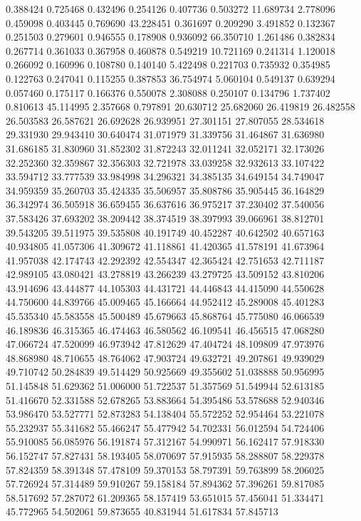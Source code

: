 0.388424
0.725468
0.432496
0.254126
0.407736
0.503272
11.689734
2.778096
0.459098
0.403445
0.769690
43.228451
0.361697
0.209290
3.491852
0.132367
0.251503
0.279601
0.946555
0.178908
0.936092
66.350710
1.261486
0.382834
0.267714
0.361033
0.367958
0.460878
0.549219
10.721169
0.241314
1.120018
0.266092
0.160996
0.108780
0.140140
5.422498
0.221703
0.735932
0.354985
0.122763
0.247041
0.115255
0.387853
36.754974
5.060104
0.549137
0.639294
0.057460
0.175117
0.166376
0.550078
2.308088
0.250107
0.134796
1.737402
0.810613
45.114995
2.357668
0.797891
20.630712
25.682060
26.419819
26.482558
26.503583
26.587621
26.692628
26.939951
27.301151
27.807055
28.534618
29.331930
29.943410
30.640474
31.071979
31.339756
31.464867
31.636980
31.686185
31.830960
31.852302
31.872243
32.011241
32.052171
32.173026
32.252360
32.359867
32.356303
32.721978
33.039258
32.932613
33.107422
33.594712
33.777539
33.984998
34.296321
34.385135
34.649154
34.749047
34.959359
35.260703
35.424335
35.506957
35.808786
35.905445
36.164829
36.342974
36.505918
36.659455
36.637616
36.975217
37.230402
37.540056
37.583426
37.693202
38.209442
38.374519
38.397993
39.066961
38.812701
39.543205
39.511975
39.535808
40.191749
40.452287
40.642502
40.657163
40.934805
41.057306
41.309672
41.118861
41.420365
41.578191
41.673964
41.957038
42.174743
42.292392
42.554347
42.365424
42.751653
42.711187
42.989105
43.080421
43.278819
43.266239
43.279725
43.509152
43.810206
43.914696
43.444877
44.105303
44.431721
44.446843
44.415090
44.550628
44.750600
44.839766
45.009465
45.166664
44.952412
45.289008
45.401283
45.535340
45.583558
45.500489
45.679663
45.868764
45.775080
46.066539
46.189836
46.315365
46.474463
46.580562
46.109541
46.456515
47.068280
47.066724
47.520099
46.973942
47.812629
47.404724
48.109809
47.973976
48.868980
48.710655
48.764062
47.903724
49.632721
49.207861
49.939029
49.710742
50.284839
49.514429
50.925669
49.355602
51.038888
50.956995
51.145848
51.629362
51.006000
51.722537
51.357569
51.549944
52.613185
51.416670
52.331588
52.678265
53.883664
54.395486
53.578688
52.940346
53.986470
53.527771
52.873283
54.138404
55.572252
52.954464
53.221078
55.232937
55.341682
55.466247
55.477942
54.702331
56.012594
54.724406
55.910085
56.085976
56.191874
57.312167
54.990971
56.162417
57.918330
56.152747
57.827431
58.193405
58.070697
57.915935
58.288807
58.229378
57.824359
58.391348
57.478109
59.370153
58.797391
59.763899
58.206025
57.726924
57.314489
59.910267
59.158184
57.894362
57.396261
59.817085
58.517692
57.287072
61.209365
58.157419
53.651015
57.456041
51.334471
45.772965
54.502061
59.873655
40.831944
51.617834
57.845713
